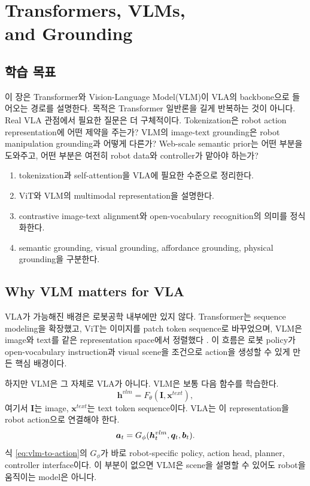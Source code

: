 \chapter[Transformers, VLMs, and Grounding]{Transformers, VLMs,\\and Grounding}

\section*{학습 목표}

이 장은 Transformer와 Vision-Language Model(VLM)이 VLA의 backbone으로 들어오는 경로를 설명한다. 목적은 Transformer 일반론을 길게 반복하는 것이 아니다. Real VLA 관점에서 필요한 질문은 더 구체적이다. Tokenization은 robot action representation에 어떤 제약을 주는가? VLM의 image-text grounding은 robot manipulation grounding과 어떻게 다른가? Web-scale semantic prior는 어떤 부분을 도와주고, 어떤 부분은 여전히 robot data와 controller가 맡아야 하는가?

\begin{enumerate}
  \item tokenization과 self-attention을 VLA에 필요한 수준으로 정리한다.
  \item ViT와 VLM의 multimodal representation을 설명한다.
  \item contrastive image-text alignment와 open-vocabulary recognition의 의미를 정식화한다.
  \item semantic grounding, visual grounding, affordance grounding, physical grounding을 구분한다.
\end{enumerate}

\section{Why VLM matters for VLA}

VLA가 가능해진 배경은 로봇공학 내부에만 있지 않다. Transformer는 sequence modeling을 확장했고, ViT는 이미지를 patch token sequence로 바꾸었으며, VLM은 image와 text를 같은 representation space에서 정렬했다 \cite{vaswani2017,dosovitskiy2021vit,clip2021,flamingo2022,blip22023}. 이 흐름은 로봇 policy가 open-vocabulary instruction과 visual scene을 조건으로 action을 생성할 수 있게 만든 핵심 배경이다.

하지만 VLM은 그 자체로 VLA가 아니다. VLM은 보통 다음 함수를 학습한다.
\begin{equation}
  \bm{h}^{vlm}
  =
  F_{\theta}(\bm{I},\bm{x}^{text}),
  \label{eq:vlm-representation}
\end{equation}
여기서 $\bm{I}$는 image, $\bm{x}^{text}$는 text token sequence이다. VLA는 이 representation을 robot action으로 연결해야 한다.
\begin{equation}
  \bm{a}_t
  =
  G_{\phi}(\bm{h}^{vlm}_t,\bm{q}_t,\bm{b}_t).
  \label{eq:vlm-to-action}
\end{equation}
식 \eqref{eq:vlm-to-action}의 $G_{\phi}$가 바로 robot-specific policy, action head, planner, controller interface이다. 이 부분이 없으면 VLM은 scene을 설명할 수 있어도 robot을 움직이는 model은 아니다.

